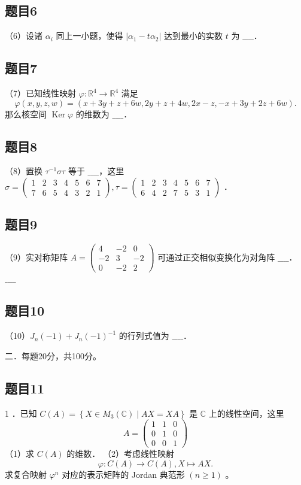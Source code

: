 \documentclass{article}
\begin{document}
\subsection{题目6}
（6）设诸 \(\alpha_{i}\) 同上一小题，使得 \(\left|\alpha_{1}-t \alpha_{2}\right|\) 达到最小的实数 \(t\) 为 \(\_\_\_\_\)．

\subsection{题目7}
（7）已知线性映射 \(\varphi: \mathbb{R}^{4} \rightarrow \mathbb{R}^{4}\) 满足
\[
\varphi(x, y, z, w)=(x+3 y+z+6 w, 2 y+z+4 w, 2 x-z,-x+3 y+2 z+6 w) .
\]
那么核空间 \(\operatorname{Ker} \varphi\) 的维数为 \(\_\_\_\_\)．

\subsection{题目8}
（8）置换 \(\tau^{-1} \sigma \tau\) 等于 \(\_\_\_\_\)，这里 \(\sigma=\left(\begin{array}{ccccccc}1 & 2 & 3 & 4 & 5 & 6 & 7 \\ 7 & 6 & 5 & 4 & 3 & 2 & 1\end{array}\right), \tau=\left(\begin{array}{ccccccc}1 & 2 & 3 & 4 & 5 & 6 & 7 \\ 6 & 4 & 2 & 7 & 5 & 3 & 1\end{array}\right)\) ．

\subsection{题目9}
（9）实对称矩阵 \(A=\left(\begin{array}{ccc}4 & -2 & 0 \\ -2 & 3 & -2 \\ 0 & -2 & 2\end{array}\right)\) 可通过正交相似变换化为对角阵 \(\_\_\_\_\)．
\(\_\_\_\_\)

\subsection{题目10}
（10）\(J_{n}(-1)+J_{n}(-1)^{-1}\) 的行列式值为 \(\_\_\_\_\)．

二．每题20分，共100分。

\subsection{题目11}
1 ．已知 \(C(A)=\left\{X \in M_{3}(\mathbb{C}) \mid A X=X A\right\}\) 是 \(\mathbb{C}\) 上的线性空间，这里
\[
A=\left(\begin{array}{lll}
1 & 1 & 0 \\
0 & 1 & 0 \\
0 & 0 & 1
\end{array}\right)
\]
（1）求 \(C(A)\) 的维数．
（2）考虑线性映射
\[
\varphi: C(A) \rightarrow C(A), X \mapsto A X .
\]
求复合映射 \(\varphi^{n}\) 对应的表示矩阵的 Jordan 典范形 \((n \geq 1)\) 。
\end{document}
